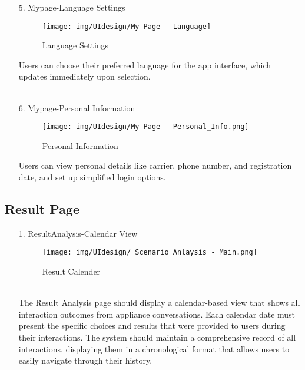 \documentclass[conference]{IEEEtran}
\begin{document}
\begin{enumerate}
\begin{itemize}
\begin{itemize}
\begin{enumerate}
\begin{enumerate}
    \item[5.] Mypage-Language Settings
    \begin{figure}[h]
        {\centering
        \hspace{4cm}
        \begin{minipage}{0.4\columnwidth}
            \texttt{[image: img/UIdesign/My Page - Language]}
            \caption{Language Settings}
        \end{minipage}}
    \end{figure}

    Users can choose their preferred language for the app interface, which updates immediately upon selection. \\ \\
\end{enumerate}

\begin{enumerate}
    \item[6.] Mypage-Personal Information
    \begin{figure}[h]
        {\centering
        \hspace{4cm}
        \begin{minipage}{0.4\columnwidth}
            \texttt{[image: img/UIdesign/My Page - Personal\_Info.png]}
            \caption{Personal Information}
        \end{minipage}}
    \end{figure}

    Users can view personal details like carrier, phone number, and registration date, and set up simplified login options.
\end{enumerate}


\subsection{Result Page}
    \begin{enumerate}
        \item[1.] ResultAnalysis-Calendar View
        \begin{figure}[h]
        {\centering
        \hspace{4cm}
        \begin{minipage}{0.4\columnwidth}
            \texttt{[image: img/UIdesign/\_Scenario Anlaysis - Main.png]}
            \caption{Result Calender}
        \end{minipage}}
    \end{figure}
        \\ The Result Analysis page should display a calendar-based view that shows all interaction outcomes from appliance conversations. Each calendar date must present the specific choices and results that were provided to users during their interactions. The system should maintain a comprehensive record of all interactions, displaying them in a chronological format that allows users to easily navigate through their history.\\
    \end{enumerate}
    

\end{enumerate}
\end{itemize}
\end{itemize}
\end{enumerate}
\end{document}
